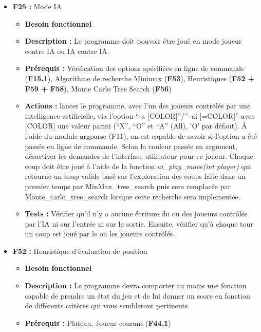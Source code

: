 \documentclass{article}
\begin{document}
\begin{itemize}
\begin{itemize}
\begin{itemize}
\begin{itemize}
            \end{itemize}
        \end{itemize}
    \end{itemize}
\bigskip
    \item \textbf{F25 :} Mode IA
    \begin{itemize}
        \item \textbf{Besoin fonctionnel}
        \item \textbf{Description :} Le programme doit pouvoir être joué en mode joueur contre IA ou IA contre IA.
        \item \textbf{Prérequis :} Vérification des options spécifiées en ligne de commande (\textbf{F15.1}), Algorithme de recherche Minimax (\textbf{F53}), Heuristiques (\textbf{F52 + F59 + F58}), Monte Carlo Tree Search (\textbf{F56})
        \item \textbf{Actions :} lancer le programme, avec l’un des joueurs contrôlés par une intelligence artificielle, via l’option  “-a [COLOR]”/”--ai [=COLOR]” avec [COLOR] une valeur parmi (“X”, “O” et “A” (All), ’O’ par défaut). À l’aide du module argparse (F11), on est capable de savoir si l’option a été passée en ligne de commande. Selon la couleur passée en argument, désactiver les demandes de l’interface utilisateur pour ce joueur. Chaque coup doit être joué à l’aide de la fonction \textit{ai\_play\_move(int player)} qui retourne un coup valide basé sur l’exploration des coups faite dans un premier temps par MinMax\_tree\_search puis sera remplacée par Monte\_carlo\_tree\_search lorsque cette recherche sera implémentée.
        \item \textbf{Tests :} Vérifier qu’il n’y a aucune écriture du ou des  joueurs contrôlés par l’IA ni sur l’entrée ni sur la sortie. Ensuite, vérifier qu’à chaque tour un coup est joué par le ou les joueurs contrôlés.
    \end{itemize}
\bigskip
    \item \label{heuristique1} \textbf{F52 :} Heuristique d’évaluation de position
    \begin{itemize}
        \item \textbf{Besoin fonctionnel}
        \item \textbf{Description :} Le programme devra comporter au moins une fonction capable de prendre un état du jeu et de lui donner un score en fonction de différents critères qui vous sembleront pertinents.
        \item \textbf{Prérequis :} Plateau, Joueur courant (\textbf{F44.1})

\end{itemize}
\end{itemize}
\end{document}
